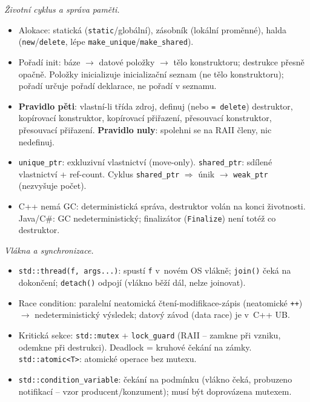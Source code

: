 \documentclass[11pt,a4paper]{article}
\newcommand{\cd}{\lstinline[style=cpp]}
\begin{document}
\begin{poznamka}
\smallskip
\emph{Životní cyklus a správa paměti.}
\begin{itemize}
  \item Alokace: statická (\cd{static}/globální), zásobník (lokální proměnné), halda (\cd{new}/\cd{delete}, lépe \cd{make_unique}/\cd{make_shared}).
  \item Pořadí init: báze $\to$ datové položky $\to$ tělo konstruktoru; destrukce přesně opačně. Položky inicializuje inicializační seznam (ne tělo konstruktoru); pořadí určuje pořadí deklarace, ne pořadí v seznamu.
  \item \textbf{Pravidlo pěti}: vlastní-li třída zdroj, definuj (nebo \cd{= delete}) destruktor, kopírovací konstruktor, kopírovací přiřazení, přesouvací konstruktor, přesouvací přiřazení. \textbf{Pravidlo nuly}: spolehni se na RAII členy, nic nedefinuj.
  \item \cd{unique_ptr}: exkluzivní vlastnictví (move-only). \cd{shared_ptr}: sdílené vlastnictví + ref-count. Cyklus \cd{shared_ptr} $\Rightarrow$ únik $\to$ \cd{weak_ptr} (nezvyšuje počet).
  \item C++ nemá GC: deterministická správa, destruktor volán na konci životnosti. Java/C\#: GC nedeterministický; finalizátor (\texttt{Finalize}) není totéž co destruktor.
\end{itemize}

\smallskip
\emph{Vlákna a synchronizace.}
\begin{itemize}
  \item \cd{std::thread(f, args...)}: spustí \cd{f} v~novém OS vlákně; \cd{join()} čeká na dokončení; \cd{detach()} odpojí (vlákno běží dál, nelze joinovat).
  \item Race condition: paralelní neatomická čtení-modifikace-zápis (neatomické \cd{++}) $\to$ nedeterministický výsledek; datový závod (data race) je v~C++ UB.
  \item Kritická sekce: \cd{std::mutex} + \cd{lock_guard} (RAII -- zamkne při vzniku, odemkne při destrukci). Deadlock = kruhové čekání na zámky. \cd{std::atomic<T>}: atomické operace bez mutexu.
  \item \cd{std::condition_variable}: čekání na podmínku (vlákno čeká, probuzeno notifikací -- vzor producent/konzument); musí být doprovázena mutexem.
\end{itemize}


\end{poznamka}
\end{document}
